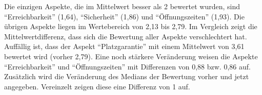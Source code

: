 \documentclass[11pt, a4paper]{article}
\begin{document}
	\raggedright
\newpage


Die einzigen Aspekte, die im Mittelwert besser als 2 bewertet wurden, sind “Erreichbarkeit” (1,64), “Sicherheit” (1,86) und “Öffnungszeiten” (1,93). Die übrigen Aspekte liegen im Wertebereich von 2,13 bis 2,79.
Im Vergleich zeigt die Mittelwertdifferenz, dass sich die Bewertung aller Aspekte verschlechtert hat. Auffällig ist, dass der Aspekt “Platzgarantie” mit einem Mittelwert von 3,61 bewertet wird (vorher 2,79). Eine noch stärkere Veränderung weisen die Aspekte “Erreichbarkeit” und “Öffnungszeiten” mit Differenzen von 0,88 bzw. 0,86 auf.
Zusätzlich wird die Veränderung des Medians der Bewertung vorher und jetzt angegeben. Vereinzelt zeigen diese eine Differenz von 1 auf.
\end{document}
